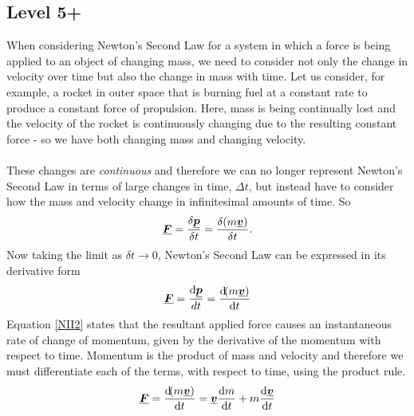 \subsection{Level 5+}
When considering Newton's Second Law for a system in which a force is being applied to an object of changing mass, we need to consider not only the change in velocity over time but also the change in mass with time.  Let us consider, for example, a rocket in outer space that is burning fuel at a constant rate to produce a constant force of propulsion.  Here, mass is being continually lost and the velocity of the rocket is continuously changing due to the resulting constant force - so we have both changing mass and changing velocity.\\
\\
These changes are {\it continuous} and therefore we can no longer represent Newton's Second Law in terms of large changes in time, $\Delta t$, but instead have to consider how the mass and velocity change in infinitesimal amounts of time.  So
\begin{equation}
{\mathit{\underline{\boldsymbol{F}}}}= \frac{\delta{\mathit{\underline{\boldsymbol{p}}}}}{\delta t}= \frac{\delta(m {\mathit{\underline{\boldsymbol{v}}}})}{\delta t}.
\end{equation}
Now taking the limit as $\delta t \rightarrow 0$, Newton's Second Law can be expressed in its derivative form
\begin{equation}
{\mathit{\underline{\boldsymbol{F}}}}=\frac{\operatorname{d}\!{\mathit{\underline{\boldsymbol{p}}}}}{dt}=\frac{\operatorname{d}\!(m{\mathit{\underline{\boldsymbol{v}}}})}{\operatorname{d}\! t} \label{NII2}
\end{equation}
Equation \ref{NII2} states that the resultant applied force causes an instantaneous rate of change of momentum, given by the derivative of the momentum with respect to time.  Momentum is the product of mass and velocity and therefore we must differentiate each of the terms, with respect to time, using the product rule. 
 \begin{equation}
{\mathit{\underline{\boldsymbol{F}}}}=\frac{\operatorname{d}\!(m{\mathit{\underline{\boldsymbol{v}}}})}{\operatorname{d}\! t}={\mathit{\underline{\boldsymbol{v}}}}\frac{\operatorname{d}\! m}{\operatorname{d}\! t}+m\frac{\operatorname{d}\!{\mathit{\underline{\boldsymbol{v}}}}}{\operatorname{d}\! t}
\end{equation}
